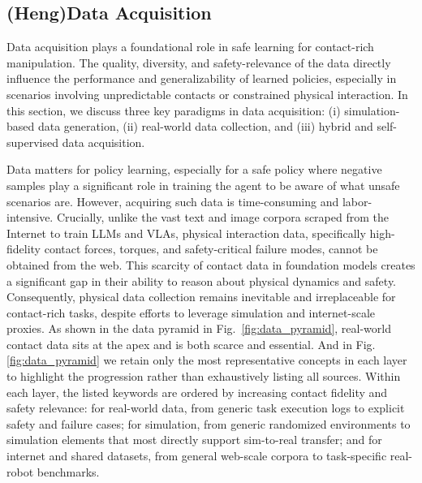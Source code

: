\documentclass[Afour,sageh,times]{template/sagej}
\newcommand{\suggest}[1]{{\color{olive} (#1)}}
\begin{document}
\subsection{\suggest{Heng}Data Acquisition}
\label{sec:data_acquisition}
Data acquisition plays a foundational role in safe learning for contact-rich manipulation. The quality, diversity, and safety-relevance of the data directly influence the performance and generalizability of learned policies, especially in scenarios involving unpredictable contacts or constrained physical interaction. In this section, we discuss three key paradigms in data acquisition: (i) simulation-based data generation, (ii) real-world data collection, and (iii) hybrid and self-supervised data acquisition.

Data matters for policy learning, especially for a safe policy where negative samples play a significant role in training the agent to be aware of what unsafe scenarios are. However, acquiring such data is time-consuming and labor-intensive. Crucially, unlike the vast text and image corpora scraped from the Internet to train LLMs and VLAs, physical interaction data, specifically high-fidelity contact forces, torques, and safety-critical failure modes, cannot be obtained from the web. This scarcity of contact data in foundation models creates a significant gap in their ability to reason about physical dynamics and safety. Consequently, physical data collection remains inevitable and irreplaceable for contact-rich tasks, despite efforts to leverage simulation and internet-scale proxies. As shown in the data pyramid in Fig.~\ref{fig:data_pyramid}, real-world contact data sits at the apex and is both scarce and essential.
 And in Fig.\ref{fig:data_pyramid} we retain only the most representative concepts in each layer to highlight the progression rather than exhaustively listing all sources. Within each layer, the listed keywords are ordered by increasing contact fidelity and safety relevance: for real-world data, from generic task execution logs to explicit safety and failure cases; for simulation, from generic randomized environments to simulation elements that most directly support sim-to-real transfer; and for internet and shared datasets, from general web-scale corpora to task-specific real-robot benchmarks.
\end{document}
